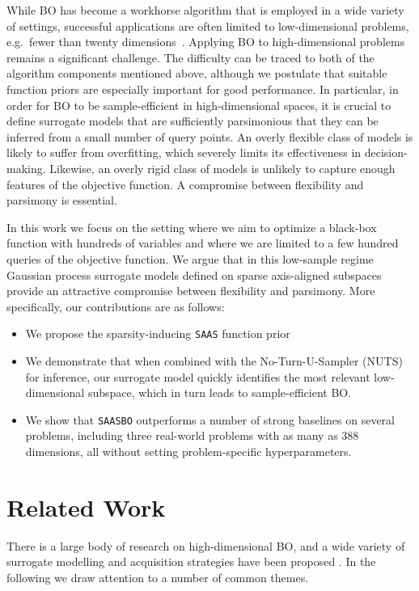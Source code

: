 \documentclass[accepted]{uai2021} %
\newcommand{\algoname}{{\texttt {SAASBO}}}
\newcommand{\priorname}{{\texttt {SAAS}}}
\begin{document}
While BO has become a workhorse algorithm that is employed in a wide variety of settings, successful applications are often limited to low-dimensional problems, e.g.~fewer than twenty dimensions~\citep{frazier2018tutorial}.
Applying BO to high-dimensional problems remains a significant challenge.
The difficulty can be traced to both of the algorithm components mentioned above,
although we postulate that suitable function priors are especially important for
good performance.
In particular, in order for BO to be sample-efficient in high-dimensional spaces, it is crucial to define surrogate models that are sufficiently parsimonious that they can be inferred from a small number of query points.
An overly flexible class of models is likely to suffer from overfitting, which severely limits its effectiveness in decision-making.
Likewise, an overly rigid class of models is unlikely to capture enough features of the objective function.
A compromise between flexibility and parsimony is essential.

In this work we focus on the setting where we aim to optimize a black-box function with hundreds of variables and where we are limited to a few hundred queries of the objective function.
We argue that in this low-sample regime Gaussian process surrogate models defined on sparse axis-aligned subspaces provide an attractive compromise between flexibility and parsimony.
More specifically, our contributions are as follows:
\begin{itemize}
    \item We propose the sparsity-inducing \priorname{} function prior
    \item We demonstrate that when combined with the No-Turn-U-Sampler (NUTS) for inference,
        our surrogate model quickly identifies the most relevant low-dimensional subspace, which in turn leads to sample-efficient BO.
    \item We show that \algoname{}
        outperforms a number of strong baselines on several problems, including three real-world problems with as many as 388 dimensions, all without setting problem-specific hyperparameters.
\end{itemize}


\section{Related Work}
\label{sec:related}
There is a large body of research on high-dimensional BO, and a wide variety
of surrogate modelling and acquisition strategies have been proposed \citep{chen2012joint}. In
the following we draw attention to a number of common themes.
\end{document}
